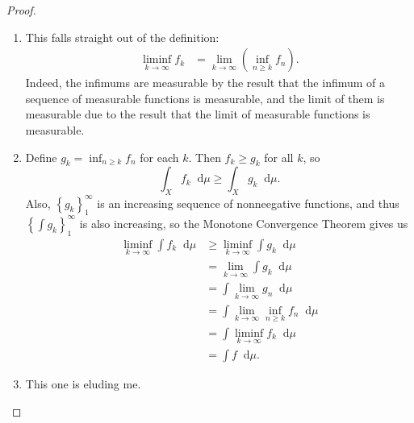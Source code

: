 \documentclass[12pt]{article}
\newcommand{\dd}{\mathop{}\!\mathrm{d}}
\theoremstyle{definition}
\begin{document}
\begin{proof}\
	\begin{enumerate}[label=(\alph*)]
		\item This falls straight out of the definition: \begin{align*}
			      \liminf_{k \to \infty} f_k & = \lim_{k \to \infty} \left(\inf_{n \geq k} f_n \right).
		      \end{align*}
		      Indeed, the infimums are measurable by the result that the infimum of a sequence of measurable functions is measurable, and the limit of them is measurable due to the result that the limit of measurable functions is measurable.
		\item Define $g_k = \inf_{n \geq k} f_n$ for each $k$.
		      Then $f_k \geq g_k$ for all $k$, so \begin{equation*}
			      \int_X f_k\dd\mu \geq \int_X g_k\dd\mu.
		      \end{equation*}
		      Also, $\left\lbrace g_k \right\rbrace_1^\infty$ is an increasing sequence of nonneegative functions, and thus $\left\lbrace \int g_k \right\rbrace_1^\infty$ is also increasing, so the Monotone Convergence Theorem gives us \begin{align*}
			      \liminf_{k \to \infty} \int f_k\dd\mu & \geq \liminf_{k \to \infty} \int g_k\dd\mu          \\
			                                            & = \lim_{k \to \infty} \int g_k \dd\mu               \\
			                                            & = \int \lim_{k\to\infty} g_n \dd\mu                 \\
			                                            & = \int \lim_{k\to\infty} \inf_{n \geq k} f_n \dd\mu \\
			                                            & = \int \liminf_{k\to\infty} f_k \dd\mu              \\
			                                            & = \int f \dd\mu.
		      \end{align*}
		\item This one is eluding me.
	\end{enumerate}
\end{proof}
\end{document}
